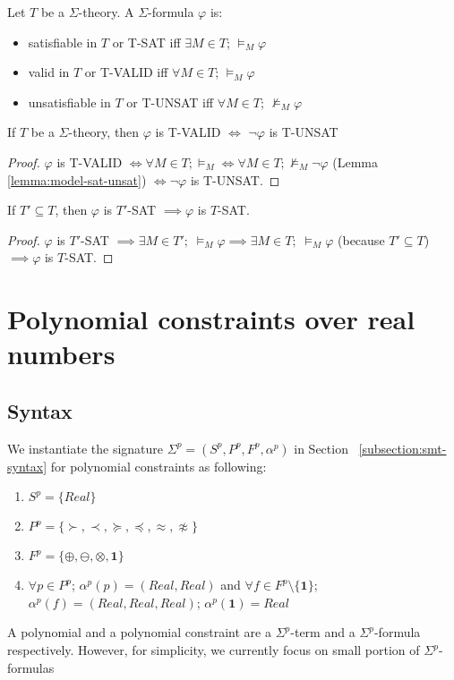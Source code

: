 \begin{definition}
Let $T$ be a $\Sigma$-theory. A $\Sigma$-formula $\varphi$ is:
\begin{itemize}
\item satisfiable in $T$ or T-SAT iff $\exists M \in T$; $\models_{M} \varphi$
\item valid in $T$ or T-VALID iff $\forall M \in T$; $\models_{M} \varphi$
\item unsatisfiable in $T$ or T-UNSAT iff $\forall M \in T$; $\not\models_{M} \varphi$
\end{itemize}
\end{definition}

\begin{lemma} \label{lemma:theory-valid-unsat}
If $T$ be a $\Sigma$-theory, then $\varphi$ is T-VALID $\iff$ $\neg\varphi$ is T-UNSAT
\end{lemma}

\begin{proof}
$\varphi$ is T-VALID $\iff \forall M \in T; \models_{M} \iff \forall M \in T; \not\models_{M} \neg\varphi$ (Lemma \ref{lemma:model-sat-unsat}) $\iff \neg\varphi$ is T-UNSAT.
\end{proof}

\begin{lemma} \label{lemma:subtheory-SAT}
If $T' \subseteq T$, then $\varphi$ is $T'$-SAT $\implies \varphi$ is $T$-SAT.
\end{lemma}

\begin{proof}
$\varphi$ is $T'$-SAT $\implies \exists M \in T'; \; \models_M \varphi \implies \exists M \in T; \; \models_M \varphi$ (because $T' \subseteq T$) $\implies \varphi$ is $T$-SAT.
\end{proof}

\section{Polynomial constraints over real numbers}
\subsection{Syntax}
We instantiate the signature $\Sigma^p = (S^p, P^p, F^p, \alpha^p)$ in Section ~\ref{subsection:smt-syntax} for polynomial constraints as following:
\begin{enumerate}
\item $S^p = \{Real\}$
\item $P^p = \{\succ, \prec, \succeq, \preceq, \approx, \not\approx\}$
\item $F^p = \{\oplus, \ominus, \otimes, \mathbf{1}\}$
\item $\forall p \in P^p$; $\alpha^p(p) = (Real, Real)$ and $\forall f \in F^p\setminus \{\mathbf{1}\}$; $\alpha^p(f) = (Real, Real, Real)$; $\alpha^p(\mathbf{1})=Real$
\end{enumerate}
A polynomial and a polynomial constraint are a $\Sigma^p$-term and a $\Sigma^p$-formula respectively. However, for simplicity, we currently focus on small portion of $\Sigma^p$-formulas

